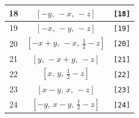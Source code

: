 \documentclass[fleqn,8pt]{jsarticle}
\begin{document}
\begin{longtable}{ccc}
18 & $\left[ - y,\, - x,\, - z \right]$ & {\tt [18]} \\ \hline
19 & $\left[ - x,\, - y,\, - z \right]$ & {\tt [19]} \\ \hline
20 & $\left[ - x + y,\, - x,\, \frac{1}{2} - z \right]$ & {\tt [20]} \\ \hline
21 & $\left[ y,\, - x + y,\, - z \right]$ & {\tt [21]} \\ \hline
22 & $\left[ x,\, y,\, \frac{1}{2} - z \right]$ & {\tt [22]} \\ \hline
23 & $\left[ x - y,\, x,\, - z \right]$ & {\tt [23]} \\ \hline
24 & $\left[ - y,\, x - y,\, \frac{1}{2} - z \right]$ & {\tt [24]} \\
\end{longtable}
\end{document}
